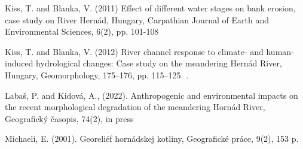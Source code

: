{Kiss, T. and Blanka, V. (2011) Effect of different water stages on bank erosion, case study on River Hernád, Hungary, Carpathian Journal of Earth and Environmental Sciences, 6(2), pp. 101-108

Kiss, T. and Blanka, V. (2012) River channel response to climate- and human-induced hydrological changes: Case study on the meandering Hernád River, Hungary, Geomorphology, 175–176, pp. 115–125. .

Labaš, P. and Kidová, A., (2022). Anthropogenic and environmental impacts on the recent morphological degradation of the meandering Hornád River, Geografický časopis,  74(2), in press

Michaeli, E. (2001). Georeliéf hornádskej kotliny, Geografické práce, 9(2), 153 p.
}


